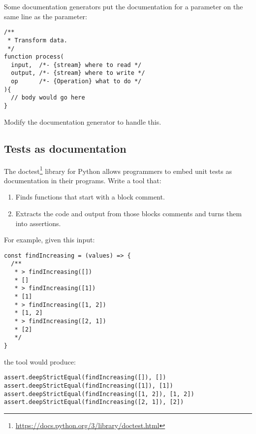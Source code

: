 \documentclass[krantzl]{krantz}
\newcommand{\hreffoot}[2]{{#1}\footnote{\href{#2}{#2}}}
\begin{document}
Some documentation generators put the documentation for a parameter
on the same line as the parameter:

\begin{lstlisting}[frame=tblr]
/**
 * Transform data.
 */
function process(
  input,  /*- {stream} where to read */
  output, /*- {stream} where to write */
  op      /*- {Operation} what to do */
){
  // body would go here
}
\end{lstlisting}


\noindent Modify the documentation generator to handle this.

\subsection*{Tests as documentation}


The \hreffoot{doctest}{https://docs.python.org/3/library/doctest.html} library for Python
allows programmers to embed unit tests as documentation in their programs.
Write a tool that:

\begin{enumerate}

\item 

Finds functions that start with a block comment.



\item 

Extracts the code and output from those blocks comments
    and turns them into assertions.



\end{enumerate}


\noindent For example, given this input:

\begin{lstlisting}[frame=tblr]
const findIncreasing = (values) => {
  /**
   * > findIncreasing([])
   * []
   * > findIncreasing([1])
   * [1]
   * > findIncreasing([1, 2])
   * [1, 2]
   * > findIncreasing([2, 1])
   * [2]
   */
}
\end{lstlisting}


\noindent the tool would produce:

\begin{lstlisting}[frame=tblr]
assert.deepStrictEqual(findIncreasing([]), [])
assert.deepStrictEqual(findIncreasing([1]), [1])
assert.deepStrictEqual(findIncreasing([1, 2]), [1, 2])
assert.deepStrictEqual(findIncreasing([2, 1]), [2])
\end{lstlisting}
\end{document}

